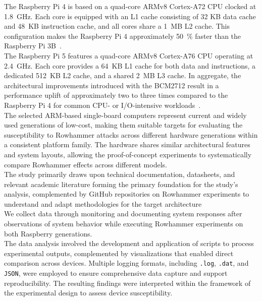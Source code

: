     The Raspberry Pi 4 is based on a quad-core ARMv8 Cortex-A72 CPU clocked at 1.8~GHz. Each core is equipped
    with an L1 cache consisting of 32 KB data cache and 48~KB instruction cache, and all cores share a 1~MB 
    L2 cache. This configuration makes the Raspberry Pi 4 approximately 50~\% faster than the Raspberry Pi 3B~\cite{webProcessors}.
    \\
    The Raspberry Pi 5 features a quad-core ARMv8 Cortex-A76 CPU operating at 2.4~GHz. Each core provides a 
    64~KB L1 cache for both data and instructions, a dedicated 512~KB L2 cache, and a shared 2~MB L3 cache. 
    In aggregate, the architectural improvements introduced with the BCM2712 result in a performance uplift 
    of approximately two to three times compared to the Raspberry Pi 4 for common CPU- or I/O-intensive 
    workloads~\cite{webProcessors}.
    \\
    The selected  ARM-based single-board computers represent current and widely 
    used generations of low-cost, making them suitable targets for evaluating 
    the susceptibility to Rowhammer attacks across different hardware generations 
    within a consistent platform family.
    The hardware shares similar architectural features and system layouts, allowing 
    the proof-of-concept experiments to systematically compare Rowhammer effects 
    across different models.
    \\
    The study primarily draws upon technical documentation, datasheets, and relevant academic literature
    forming the primary foundation for the study's analysis, complemented by GitHub repositories on 
    Rowhammer experiments to understand and adapt methodologies for the target architecture
    \\
    We collect data through monitoring and documenting system responses after observations 
    of system behavior while executing Rowhammer experiments on both Raspberry generations.
    \\
    The data analysis involved the development and application of scripts to process 
    experimental outputs, complemented by visualizations that enabled 
    direct comparison across devices. Multiple logging 
    formats, including \texttt{.log}, \texttt{.dat}, and \texttt{JSON}, were employed to ensure comprehensive 
    data capture and support reproducibility. The resulting findings were interpreted 
    within the framework of the experimental design to assess device susceptibility.


